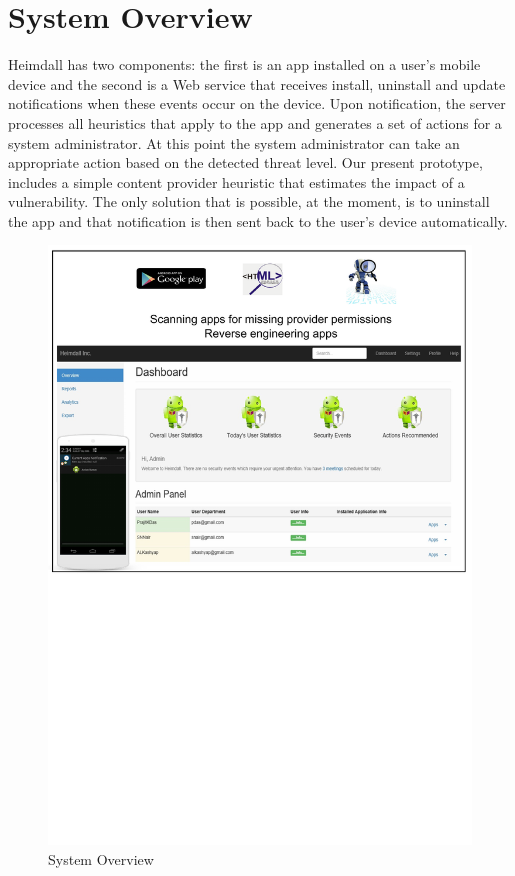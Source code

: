 \section{System Overview}
\label{overview}

Heimdall has two components: the first is an app installed on a user's mobile device and the second is a Web service that receives install, uninstall and update notifications when these events occur on the device. Upon notification, the server processes all heuristics that apply to the app and generates a set of actions for a system administrator. At this point the system administrator can take an appropriate action based on the detected threat level. Our present prototype, includes a simple content provider heuristic that estimates the impact of a vulnerability. The only solution that is possible, at the moment, is to uninstall the app and that notification is then sent back to the user's device automatically.

\begin{figure}[tb]
	\centering
	\includegraphics[width=\columnwidth]{images/architecture}
	\caption{System Overview}
	\label{fig:arch}
\end{figure}

